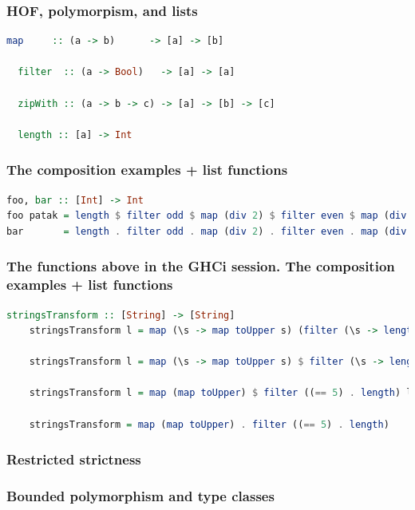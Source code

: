 \documentclass[10pt,pdf,utf8,russian,aspectratio=169]{beamer}
\begin{document}
\begin{frame}[fragile]
  \frametitle{HOF, polymorpism, and lists}

  \begin{lstlisting}[language=Haskell]
  map     :: (a -> b)      -> [a] -> [b]

  filter  :: (a -> Bool)   -> [a] -> [a]

  zipWith :: (a -> b -> c) -> [a] -> [b] -> [c]

  length :: [a] -> Int

  \end{lstlisting}

\vspace{\baselineskip}

\end{frame}

\begin{frame}[fragile]
    \frametitle{The composition examples + list functions}
\begin{lstlisting}[language=Haskell]
foo, bar :: [Int] -> Int
foo patak = length $ filter odd $ map (div 2) $ filter even $ map (div 7) patak
bar       = length . filter odd . map (div 2) . filter even . map (div 7)
\end{lstlisting}
\end{frame}

\begin{frame}[fragile]
    \frametitle{The functions above in the GHCi session. The composition examples + list functions}
    \begin{lstlisting}[language=Haskell]
    stringsTransform :: [String] -> [String]
    stringsTransform l = map (\s -> map toUpper s) (filter (\s -> length s == 5) l)

    stringsTransform l = map (\s -> map toUpper s) $ filter (\s -> length s == 5) l

    stringsTransform l = map (map toUpper) $ filter ((== 5) . length) l

    stringsTransform = map (map toUpper) . filter ((== 5) . length)
    \end{lstlisting}
\end{frame}

\begin{frame}
  \frametitle{Restricted strictness}
\end{frame}

\begin{frame}
  \frametitle{Bounded polymorphism and type classes}
\end{frame}
\end{document}

